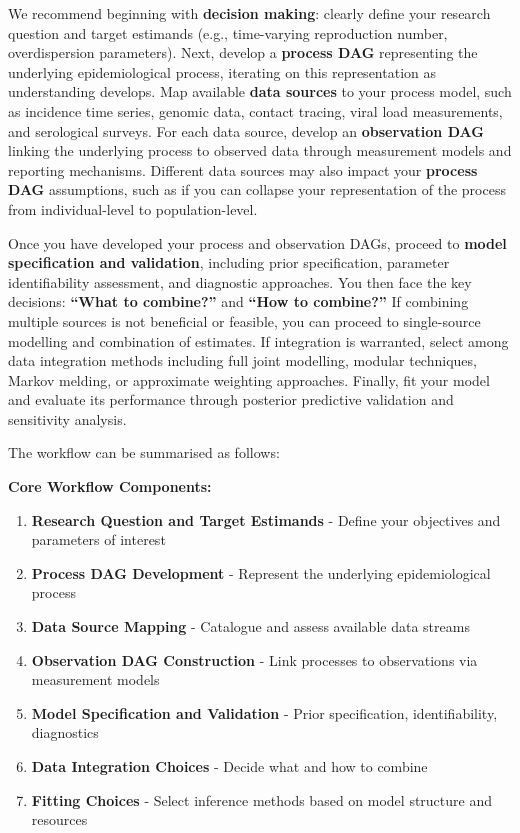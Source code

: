 \documentclass{article}
\begin{document}
We recommend beginning with \textbf{decision making}: clearly define your research question and target estimands (e.g., time-varying reproduction number, overdispersion parameters).
Next, develop a \textbf{process DAG} representing the underlying epidemiological process, iterating on this representation as understanding develops.
Map available \textbf{data sources} to your process model, such as incidence time series, genomic data, contact tracing, viral load measurements, and serological surveys.
For each data source, develop an \textbf{observation DAG} linking the underlying process to observed data through measurement models and reporting mechanisms.
Different data sources may also impact your \textbf{process DAG} assumptions, such as if you can collapse your representation of the process from individual-level to population-level.

Once you have developed your process and observation DAGs, proceed to \textbf{model specification and validation}, including prior specification, parameter identifiability assessment, and diagnostic approaches.
You then face the key decisions: \textbf{``What to combine?''} and \textbf{``How to combine?''}
If combining multiple sources is not beneficial or feasible, you can proceed to single-source modelling and combination of estimates.
If integration is warranted, select among data integration methods including full joint modelling, modular techniques, Markov melding, or approximate weighting approaches.
Finally, fit your model and evaluate its performance through posterior predictive validation and sensitivity analysis.

The workflow can be summarised as follows:

\textbf{Core Workflow Components:}
\begin{enumerate}
    \item \textbf{Research Question and Target Estimands} - Define your objectives and parameters of interest
    \item \textbf{Process DAG Development} - Represent the underlying epidemiological process
    \item \textbf{Data Source Mapping} - Catalogue and assess available data streams
    \item \textbf{Observation DAG Construction} - Link processes to observations via measurement models
    \item \textbf{Model Specification and Validation} - Prior specification, identifiability, diagnostics
    \item \textbf{Data Integration Choices} - Decide what and how to combine
    \item \textbf{Fitting Choices} - Select inference methods based on model structure and resources
\end{enumerate}
\end{document}
